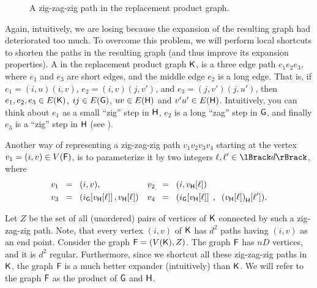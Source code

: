 \begin{figure}[t]
    \centering
    \caption{A zig-zag-zig path in the replacement product graph.}
\end{figure}

Again, intuitively, we are losing because the expansion of the
resulting graph had deteriorated too much. To overcome this problem,
we will perform local shortcuts to shorten the  paths in the
resulting graph (and thus improve its expansion properties). A
 in the replacement product graph $\mathsf{K}$,
is a three edge path $e_1 e_2 e_3$, where $e_1$ and $e_3$ are short
edges, and the middle edge $e_2$ is a long edge.  That is, if $e_1 =
(i,u) (i,v)$, $e_2 = (i,v)(j,v')$, and $e_3=(j,v')(j,u')$, then $e_1,
e_2, e_3 \in E(\mathsf{K})$, $ij \in E(\mathsf{G})$, $uv \in E(\mathsf{H})$ and
$v'u' \in E(\mathsf{H})$. Intuitively, you can think about $e_1$ as a
small ``zig'' step in $\mathsf{H}$, $e_2$ is a long ``zag'' step in
$\mathsf{G}$, and finally $e_3$ is a ``zig'' step in $\mathsf{H}$ (see ).


Another way of representing a zig-zag-zig path $v_1 v_2 v_3 v_4$
starting at the vertex $v_1 = (i,v) \in V(\mathsf{F})$, is to
parameterize it by two integers $\ell, \ell'\in\RangeI{d}$, where
\begin{align*}
    &v_1
    \EQ (i,v), && v_2 \EQ \pth[]{i,\NXExt{v}{\GraphB}{\ell}}
    \\&
    v_3 \EQ \pth{
       \NXExt{i}{\Graph}{\MakeSBig\NXExt{v}{\GraphB}{\ell}},
       \NXExt{v}{\GraphB}{\ell}}
    &
    &v_4 \EQ
    \pth{ \NXExt{i}{\Graph}{\MakeSBig\NXExt{v}{\GraphB}{\ell}} \;, \;\;
       \NXExt{\pth{\NXExt{v}{\GraphB}{\ell}\MakeSBig}}{\GraphB}{\ell'}}.
\end{align*}

Let $Z$ be the set of all (unordered) pairs of vertices of $\mathsf{K}$
connected by such a zig-zag-zig path. Note, that every vertex $(i,v)$
of $\mathsf{K}$ has $d^2$ paths having $(i,v)$ as an end point.  Consider
the graph $\mathsf{F} = (V(\mathsf{K}), Z)$. The graph $\mathsf{F}$ has $nD$
vertices, and it is $d^2$ regular. Furthermore, since we shortcut all
these zig-zag-zig paths in $\mathsf{K}$, the graph $\mathsf{F}$ is a much
better expander (intuitively) than $\mathsf{K}$. We will refer to the
graph $\mathsf{F}$ as the  product of $\mathsf{G}$ and
$\mathsf{H}$.


